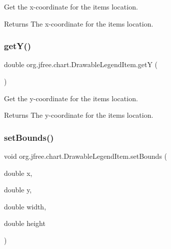 Get the x-\/coordinate for the item\textquotesingle{}s location.

\begin{DoxyReturn}{Returns}
The x-\/coordinate for the item\textquotesingle{}s location. 
\end{DoxyReturn}
\mbox{\label{classorg_1_1jfree_1_1chart_1_1_drawable_legend_item_aac2b571271ba6406831352e5a324b900}} 
\subsubsection{\texorpdfstring{get\+Y()}{getY()}}
{\footnotesize\ttfamily double org.\+jfree.\+chart.\+Drawable\+Legend\+Item.\+getY (\begin{DoxyParamCaption}{ }\end{DoxyParamCaption})}

Get the y-\/coordinate for the item\textquotesingle{}s location.

\begin{DoxyReturn}{Returns}
The y-\/coordinate for the item\textquotesingle{}s location. 
\end{DoxyReturn}
\mbox{\label{classorg_1_1jfree_1_1chart_1_1_drawable_legend_item_a86175e5b7a11a4f7dda3fa94a6703114}} 
\subsubsection{\texorpdfstring{set\+Bounds()}{setBounds()}}
{\footnotesize\ttfamily void org.\+jfree.\+chart.\+Drawable\+Legend\+Item.\+set\+Bounds (\begin{DoxyParamCaption}\item[{double}]{x,  }\item[{double}]{y,  }\item[{double}]{width,  }\item[{double}]{height }\end{DoxyParamCaption})}

